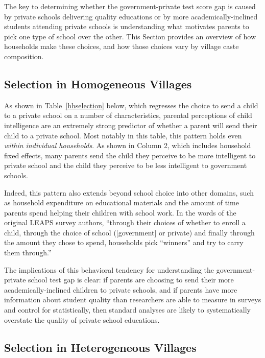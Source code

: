 \documentclass[Eubank_pk_ethnic_sorting.tex]{subfiles}
\begin{document}
The key to determining whether the government-private test score gap is caused by private schools delivering quality educations or by more academically-inclined students attending private schools is understanding what motivates parents to pick one type of school over the other. This Section provides an overview of how households make these choices, and how those choices vary by village caste composition.


\subsection{Selection in Homogeneous Villages}\label{}

As shown in Table~\ref{hhselection} below, which regresses the choice to send a child to a private school on a number of characteristics, parental perceptions of child intelligence are an extremely strong predictor of whether a parent will send their child to a private school. Most notably in this table, this pattern holds even \emph{within individual households}. As shown in Column 2, which includes household fixed effects, many parents send the child they perceive to be more intelligent to private school and the child they perceive to be less intelligent to government schools.



Indeed, this pattern also extends beyond school choice into other domains, such as household expenditure on  educational materials and the amount of time parents spend helping their children with school work. In the words of the original LEAPS survey authors, ``through their choices of whether to enroll a child, through the choice of school ([government] or private) and finally through the amount they chose to spend, households pick ``winners'' and try to carry them through.'' \citep[p. 103]{Andrabi:2007we}

The implications of this behavioral tendency for understanding the government-private school test gap is clear: if parents are choosing to send their more academically-inclined children to private schools, and if parents have more information about student quality than researchers are able to measure in surveys and control for statistically, then standard analyses are likely to systematically overstate the quality of private school educations.

\subsection{Selection in Heterogeneous Villages}\label{}
\end{document}
